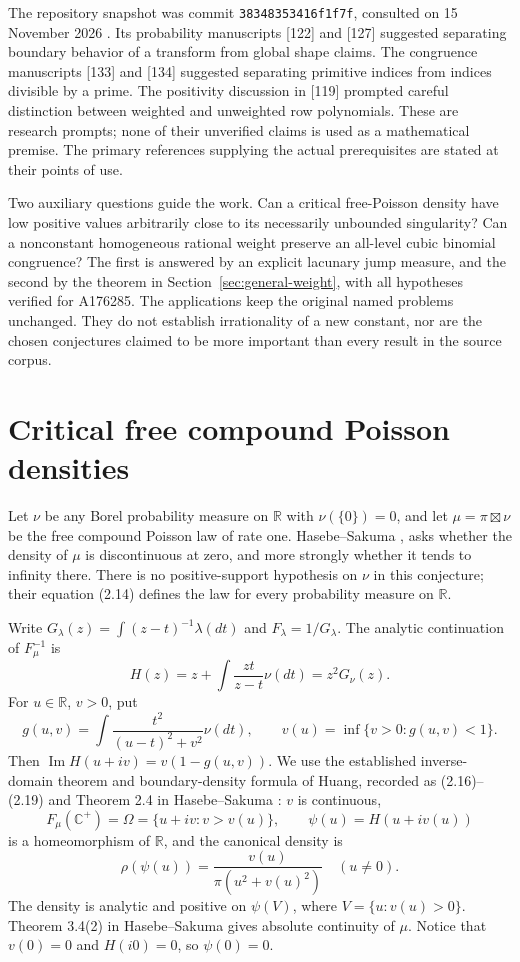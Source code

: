 \documentclass[11pt,a4paper]{article}
\numberwithin{equation}{section}
\begin{document}
The repository snapshot was commit \texttt{38348353416f1f7f}, consulted
on 15 November 2026 \cite{VMRC}. Its probability manuscripts [122] and
[127] suggested separating boundary behavior of a transform from global
shape claims. The congruence manuscripts [133] and [134] suggested
separating primitive indices from indices divisible by a prime. The
positivity discussion in [119] prompted careful distinction between
weighted and unweighted row polynomials. These are research prompts;
none of their unverified claims is used as a mathematical premise.
The primary references supplying the actual prerequisites are stated
at their points of use.

Two auxiliary questions guide the work. Can a critical free-Poisson
density have low positive values arbitrarily close to its necessarily
unbounded singularity? Can a nonconstant homogeneous rational weight
preserve an all-level cubic binomial congruence? The first is answered
by an explicit lacunary jump measure, and the second by the theorem in
Section~\ref{sec:general-weight}, with all hypotheses verified for
A176285. The applications keep the original named problems unchanged.
They do not establish irrationality of a new constant, nor are the
chosen conjectures claimed to be more important than every result in
the source corpus.


\section{Critical free compound Poisson densities}\label{sec:free}

Let $\nu$ be any Borel probability measure on $\mathbb R$ with
$\nu(\{0\})=0$, and let $\mu=\pi\boxtimes\nu$ be the free compound
Poisson law of rate one.  Hasebe--Sakuma \cite[Conjecture 3.7]{HS}, asks whether
the density of $\mu$ is discontinuous at zero, and more strongly whether
it tends to infinity there.  There is no positive-support hypothesis on
$\nu$ in this conjecture; their equation (2.14) defines the law for every
probability measure on $\mathbb R$.

Write $G_\lambda(z)=\int(z-t)^{-1}\lambda(dt)$ and
$F_\lambda=1/G_\lambda$.  The analytic continuation of $F_\mu^{-1}$ is
\[
 H(z)=z+\int\frac{zt}{z-t}\nu(dt)=z^2G_\nu(z).
\]
For $u\in\mathbb R$, $v>0$, put
\[
 g(u,v)=\int\frac{t^2}{(u-t)^2+v^2}\nu(dt),\qquad
 v(u)=\inf\{v>0:g(u,v)<1\}.
\]
Then $\operatorname{Im}H(u+iv)=v(1-g(u,v))$.
We use the established inverse-domain theorem and boundary-density
formula of Huang, recorded as (2.16)--(2.19) and Theorem 2.4 in
Hasebe--Sakuma \cite{HS}: $v$ is continuous,
\[
 F_\mu(\mathbb C^+)=\Omega=\{u+iv:v>v(u)\},\qquad
 \psi(u)=H(u+iv(u))
\]
is a homeomorphism of $\mathbb R$, and the canonical density
is
\[
 \rho(\psi(u))=\frac{v(u)}{\pi(u^2+v(u)^2)}\quad(u\ne0).
\]
The density is analytic and positive on $\psi(V)$, where
$V=\{u:v(u)>0\}$.  Theorem 3.4(2) in Hasebe--Sakuma gives absolute
continuity of $\mu$.  Notice that $v(0)=0$ and $H(i0)=0$, so $\psi(0)=0$.
\end{document}
